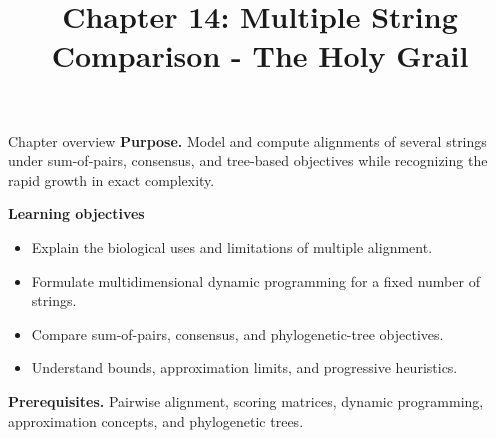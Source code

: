 \documentclass[11pt,letterpaper]{article}
\title{Chapter 14: Multiple String Comparison - The Holy Grail}
\author{}
\date{}
\begin{document}
\maketitle

\begin{CornellOverviewBox}{Chapter overview}
\textbf{Purpose.} Model and compute alignments of several strings under sum-of-pairs, consensus, and tree-based objectives while recognizing the rapid growth in exact complexity.

\textbf{Learning objectives}
\begin{itemize}
  \item Explain the biological uses and limitations of multiple alignment.
  \item Formulate multidimensional dynamic programming for a fixed number of strings.
  \item Compare sum-of-pairs, consensus, and phylogenetic-tree objectives.
  \item Understand bounds, approximation limits, and progressive heuristics.
\end{itemize}

\textbf{Prerequisites.} Pairwise alignment, scoring matrices, dynamic programming, approximation concepts, and phylogenetic trees.
\end{CornellOverviewBox}
\end{document}
